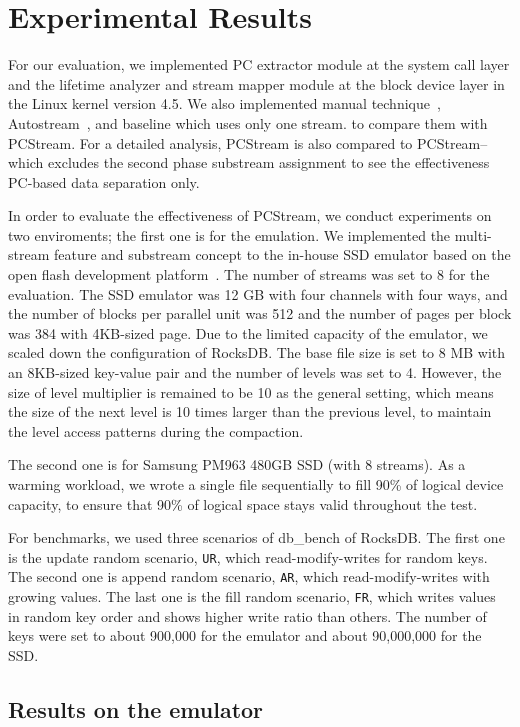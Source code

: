 \section{Experimental Results}
For our evaluation, we implemented PC extractor module at the 
system call layer 
and the lifetime analyzer and stream mapper module 
at the block device layer in the Linux kernel version 4.5.
We also implemented manual technique~\cite{MultiStream}, 
Autostream~\cite{AutoStream}, and
baseline which uses only one stream.
to compare them with {\sf PCStream}.
For a detailed analysis, {\sf PCStream} is also compared to {\sf PCStream--}
which excludes the second phase substream assignment 
to see the effectiveness PC-based data separation only.

In order to evaluate the effectiveness of {\sf PCStream},
we conduct experiments on two enviroments; the first one is 
for the emulation.
We implemented the multi-stream feature and substream concept
to the in-house SSD emulator
based on the open flash development platform~\cite{AMF}.
The number of streams was set to 8 for the evaluation.
The SSD emulator was 12 GB with four channels with four ways, and 
the number of blocks per parallel unit was 512 and
the number of pages per block was 384 with 4KB-sized page.
Due to the limited capacity of the emulator, 
we scaled down the configuration of RocksDB.
The base file size is set to 8 MB
with an 8KB-sized key-value pair and the number of levels was set to 4.
However, the size of level multiplier is remained to be 10 as the general setting,
which means the size of the next level is 10 times larger than the previous level,
to maintain the level access patterns during the compaction.

The second one is for Samsung PM963 480GB SSD (with 8 streams).
As a warming workload, we wrote a single file sequentially to fill 90\%
of logical device capacity, to ensure that 90\% of logical space stays valid
throughout the test.

For benchmarks, we used three scenarios of db\_bench of RocksDB.
The first one is the update random scenario, {\tt UR}, which read-modify-writes for random keys. 
The second one is append random scenario, {\tt AR}, which read-modify-writes with growing values.
The last one is the fill random scenario, {\tt FR}, which writes values in random key order and 
shows higher write ratio than others.
The number of keys were set to about 900,000 for the emulator and about 90,000,000 for
the SSD.

\subsection{Results on the emulator}

